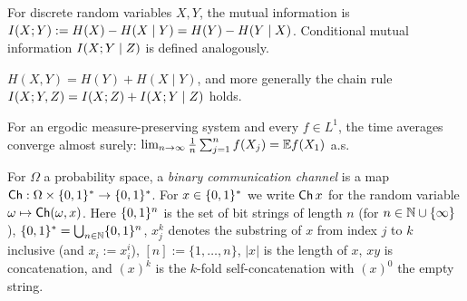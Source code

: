 \begin{definition}
  \label{def:mutual-info}
  \mathlibok
  For discrete random variables $X,Y$, the mutual information is
  $I(X;Y) := H(X) - H(X\mid Y) = H(Y) - H(Y\mid X)$. Conditional mutual
  information $I(X;Y\mid Z)$ is defined analogously.
\end{definition}

\begin{lemma}
  \label{lem:entropy-chain-rule}
  \mathlibok
  $H(X,Y) = H(Y) + H(X\mid Y)$, and more generally the chain rule
  $I(X;Y,Z) = I(X;Z) + I(X;Y\mid Z)$ holds.
\end{lemma}

\begin{theorem}
  \label{thm:birkhoff}
  \mathlibok
  For an ergodic measure-preserving system and every $f \in L^1$, the time
  averages converge almost surely:
  $\lim_{n\to\infty} \tfrac1n \sum_{j=1}^n f(X_j) = \mathbb{E} f(X_1)$ a.s.
\end{theorem}


\begin{definition}
  \label{def:channel}
  For $\Omega$ a probability space, a \emph{binary communication channel} is a
  map $\mathsf{Ch} : \Omega \times \{0,1\}^* \to \{0,1\}^*$. For $x \in \{0,1\}^*$ we write
  $\mathsf{Ch}\,x$ for the random variable $\omega \mapsto \mathsf{Ch}(\omega,x)$. Here
  $\{0,1\}^n$ is the set of bit strings of length $n$ (for $n\in\mathbb{N}\cup\{\infty\}$),
  $\{0,1\}^* = \bigcup_{n\in\mathbb{N}}\{0,1\}^n$, $x_j^k$ denotes the substring of $x$ from
  index $j$ to $k$ inclusive (and $x_i := x_i^i$), $[n] := \{1,\dots,n\}$,
  $|x|$ is the length of $x$, $xy$ is concatenation, and $(x)^k$ is the $k$-fold
  self-concatenation with $(x)^0$ the empty string.
\end{definition}

